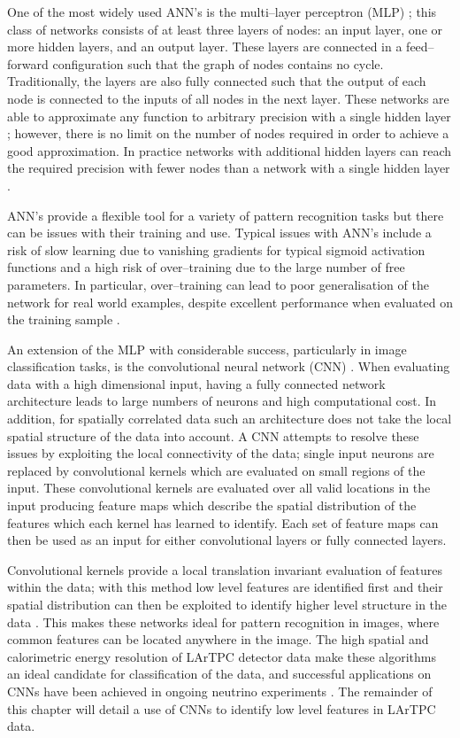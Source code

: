 One of the most widely used ANN's is the multi--layer perceptron (MLP)
\cite{Reed:1998:NSS:552600}; this class of networks consists of at least three
layers of nodes: an input layer, one or more hidden layers, and an output layer.
These layers are connected in a feed--forward configuration such that the graph
of nodes contains no cycle. Traditionally, the layers are also fully connected
such that the output of each node is connected to the inputs of all nodes in the
next layer. These networks are able to approximate any function to arbitrary
precision with a single hidden layer \cite{Cybenko1989ApproximationBS}; however,
there is no limit on the number of nodes required in order to achieve a good
approximation. In practice networks with additional hidden layers can reach the
required precision with fewer nodes than a network with a single hidden layer
\cite{Lecun2015}.

ANN's provide a flexible tool for a variety of pattern recognition tasks but
there can be issues with their training and use. Typical issues with ANN's
include a risk of slow learning due to vanishing gradients for typical sigmoid
activation functions and a high risk of over--training due to the large number
of free parameters. In particular, over--training can lead to poor
generalisation of the network for real world examples, despite excellent
performance when evaluated on the training sample \cite{Reed:1998:NSS:552600}.

An extension of the MLP with considerable success, particularly in image
classification tasks, is the convolutional neural network (CNN)
\cite{Jackel2008, Szegedy2015}. When evaluating data with a high dimensional
input, having a fully connected network architecture leads to large numbers of
neurons and high computational cost. In addition, for spatially correlated data
such an architecture does not take the local spatial structure of the data into
account. A CNN attempts to resolve these issues by exploiting the local
connectivity of the data; single input neurons are replaced by convolutional
kernels which are evaluated on small regions of the input. These convolutional
kernels are evaluated over all valid locations in the input producing feature
maps which describe the spatial distribution of the features which each kernel
has learned to identify. Each set of feature maps can then be used as an input
for either convolutional layers or fully connected layers. 

Convolutional kernels provide a local translation invariant evaluation of
features within the data; with this method low level features are identified
first and their spatial distribution can then be exploited to identify higher
level structure in the data \cite{Jackel2008}. This makes these networks ideal
for pattern recognition in images, where common features can be located anywhere
in the image. The high spatial and calorimetric energy resolution of LArTPC
detector data make these algorithms an ideal candidate for classification of the
data, and successful applications on CNNs have been achieved in ongoing neutrino
experiments \cite{Aurisano:2016jvx, Acciarri:2016ryt}. The remainder of this
chapter will detail a use of CNNs to identify low level features in LArTPC data.

